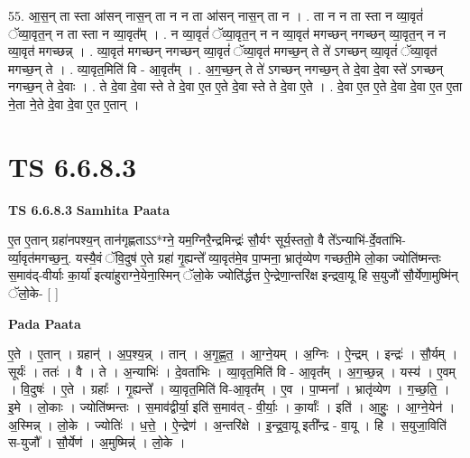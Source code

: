 \documentclass[17pt]{extarticle}
\begin{document}
55. आ॒स॒न् ता स्ता आ॑सन् नास॒न् ता न न ता आ॑सन् नास॒न् ता न । . ता न न ता स्ता न व्या॒वृतं॑ ॅव्या॒वृत॒न् न ता स्ता न व्या॒वृत᳚म् । . न व्या॒वृतं॑ ॅव्या॒वृत॒न् न न व्या॒वृत॑ मगच्छन् नगच्छन् व्या॒वृत॒न् न न व्या॒वृत॑ मगच्छन्न् । . व्या॒वृत॑ मगच्छन् नगच्छन् व्या॒वृतं॑ ॅव्या॒वृत॑ मगच्छ॒न् ते ते॑ ऽगच्छन् व्या॒वृतं॑ ॅव्या॒वृत॑ मगच्छ॒न् ते । . व्या॒वृत॒मिति॑ वि - आ॒वृत᳚म् । . अ॒ग॒च्छ॒न् ते ते॑ ऽगच्छन् नगच्छ॒न् ते दे॒वा दे॒वा स्ते॑ ऽगच्छन् नगच्छ॒न् ते दे॒वाः । . ते दे॒वा दे॒वा स्ते ते दे॒वा ए॒त ए॒ते दे॒वा स्ते ते दे॒वा ए॒ते । . दे॒वा ए॒त ए॒ते दे॒वा दे॒वा ए॒त ए॒ता ने॒ता ने॒ते दे॒वा दे॒वा ए॒त ए॒तान् । \newline
\pagebreak
{}

\section{ TS 6.6.8.3 }

\textbf{TS 6.6.8.3 } \newline
\textbf{Samhita Paata} \newline

ए॒त ए॒तान् ग्रहा॑नपश्य॒न् तान॑गृह्णताऽऽ*ग्ने॒ यम॒ग्निरै॒न्द्रमिन्द्रः॑ सौ॒र्यꣳ सूर्य॒स्ततो॒ वै ते᳚ऽन्याभि॑-र्दे॒वता॑भि-र्व्या॒वृत॑मगच्छ॒न्॒. यस्यै॒वं ॅवि॒दुष॑ ए॒ते ग्रहा॑ गृ॒ह्यन्ते᳚ व्या॒वृत॑मे॒व पा॒प्मना॒ भ्रातृ॑व्येण गच्छती॒मे लो॒का ज्योति॑ष्मन्तः स॒माव॑द्-वीर्याः का॒र्या॑ इत्या॑हुराग्ने॒येना॒स्मिन् ॅलो॒के ज्योति॑र्द्धत्त ऐ॒न्द्रेणा॒न्तरि॑क्ष इन्द्रवा॒यू हि स॒युजौ॑ सौ॒र्येणा॒मुष्मि॑न् ॅलो॒के- [  ] \newline

\textbf{Pada Paata} \newline

ए॒ते । ए॒तान् । ग्रहान्॑ । अ॒प॒श्य॒न्न् । तान् । अ॒गृ॒ह्ण॒त॒ । आ॒ग्ने॒यम् । अ॒ग्निः । ऐ॒न्द्रम् । इन्द्रः॑ । सौ॒र्यम् । सूर्यः॑ । ततः॑ । वै । ते । अ॒न्याभिः॑ । दे॒वता॑भिः । व्या॒वृत॒मिति॑ वि - आ॒वृत᳚म् । अ॒ग॒च्छ॒न्न् । यस्य॑ । ए॒वम् । वि॒दुषः॑ । ए॒ते । ग्रहाः᳚ । गृ॒ह्यन्ते᳚ । व्या॒वृत॒मिति॑ वि-आ॒वृत᳚म् । ए॒व । पा॒प्मना᳚ । भ्रातृ॑व्येण । ग॒च्छ॒ति॒ । इ॒मे । लो॒काः । ज्योति॑ष्मन्तः । स॒माव॑द्वीर्या॒ इति॑ स॒माव॑त् - वी॒र्याः॒ । का॒र्याः᳚ । इति॑ । आ॒हुः॒ । आ॒ग्ने॒येन॑ । अ॒स्मिन्न् । लो॒के । ज्योतिः॑ । ध॒त्ते॒ । ऐ॒न्द्रेण॑ । अ॒न्तरि॑क्षे । इ॒न्द्र॒वा॒यू इती᳚न्द्र - वा॒यू । हि । स॒युजा॒विति॑ स-युजौ᳚ । सौ॒र्येण॑ । अ॒मुष्मिन्न्॑ । लो॒के ।  \newline
\end{document}
